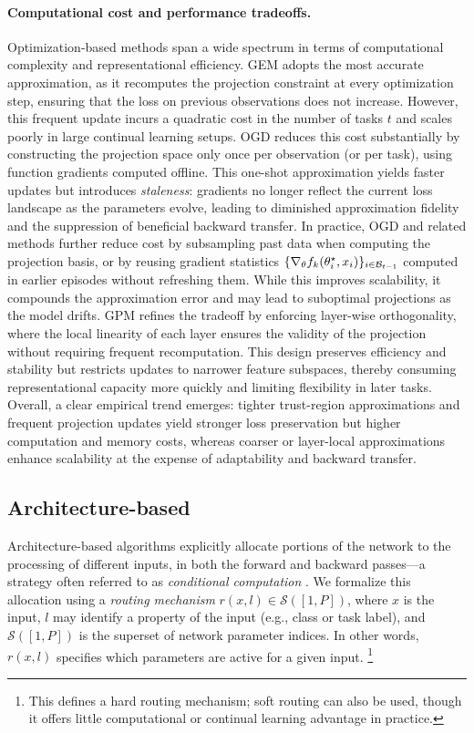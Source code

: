 \documentclass[10pt]{article} %
\newcommand{\memory}{\mathcal{B}}
\newcommand{\giulia}[1]{\todo[inline,color=brown!20]{Giulia: #1}}
\begin{document}
\paragraph{Computational cost and performance tradeoffs.}
Optimization-based methods span a wide spectrum in terms of computational complexity and representational efficiency.  
GEM adopts the most accurate approximation, as it recomputes the projection constraint at every optimization step, ensuring that the loss on previous observations does not increase.  
However, this frequent update incurs a quadratic cost in the number of tasks $t$ and scales poorly in large continual learning setups.  
OGD reduces this cost substantially by constructing the projection space only once per observation (or per task), using function gradients computed offline.  
This one-shot approximation yields faster updates but introduces \emph{staleness}: gradients no longer reflect the current loss landscape as the parameters evolve, leading to diminished approximation fidelity and the suppression of beneficial backward transfer.  
In practice, OGD and related methods further reduce cost by subsampling past data when computing the projection basis, or by reusing gradient statistics $\{\nabla_\param f_k(\param_i^\star, x_i)\}_{i \in \memory_{t-1}}$ computed in earlier episodes without refreshing them.  
While this improves scalability, it compounds the approximation error and may lead to suboptimal projections as the model drifts.  
GPM refines the tradeoff by enforcing layer-wise orthogonality, where the local linearity of each layer ensures the validity of the projection without requiring frequent recomputation.  
This design preserves efficiency and stability but restricts updates to narrower feature subspaces, thereby consuming representational capacity more quickly and limiting flexibility in later tasks.  
Overall, a clear empirical trend emerges: tighter trust-region approximations and frequent projection updates yield stronger loss preservation but higher computation and memory costs, whereas coarser or layer-local approximations enhance scalability at the expense of adaptability and backward transfer.
\giulia{Another table here}

\subsection{Architecture-based}
\label{sec:arch-based}

Architecture-based algorithms explicitly allocate portions of the network to the processing of different inputs, in both the forward and backward passes—a strategy often referred to as \emph{conditional computation} \citep{bengioEstimatingPropagatingGradients2013,bengioConditionalComputationNeural2016,shazeerOutrageouslyLargeNeural2017}. 
We formalize this allocation using a \emph{routing mechanism} $r(x, l) \in  \mathcal{S}([1,P])$, where $x$ is the input, $l$ may identify a property of the input (e.g., class or task label), and $\mathcal{S}([1,P])$ is the superset of network parameter indices. 
In other words, $r(x,l)$ specifies which parameters are active for a given input.%
\footnote{This defines a hard routing mechanism; soft routing can also be used, though it offers little computational or continual learning advantage in practice.}
\end{document}
